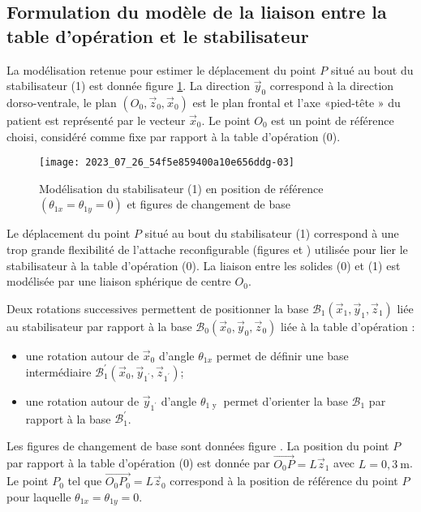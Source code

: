 \subsection{\label{sec:I.B}Formulation du modèle de la liaison entre la table d'opération et le stabilisateur}
La modélisation retenue pour estimer le déplacement du point $P$ situé au bout du stabilisateur (1) est donnée figure \ref{fig_ccspsi2022:05}. La direction $\vec{y}_{0}$ correspond à la direction dorso-ventrale, le plan $\left(O_{0}, \vec{z}_{0}, \vec{x}_{0}\right)$ est le plan frontal et l'axe «pied-tête » du patient est représenté par le vecteur $\vec{x}_{0}$. Le point $O_{0}$ est un point de référence choisi, considéré comme fixe par rapport à la table d'opération (0).

\begin{figure}[!h]
\centering
\texttt{[image: 2023\_07\_26\_54f5e859400a10e656ddg-03]}
\caption{Modélisation du stabilisateur (1) en position de référence $\left(\theta_{1 x}=\theta_{1 y}=0\right)$ et figures de changement de base\label{fig_ccspsi2022:05}}
\end{figure}


Le déplacement du point $P$ situé au bout du stabilisateur (1) correspond à une trop grande flexibilité de l'attache reconfigurable (figures \label{fig_ccspsi2022:01} et \label{fig_ccspsi2022:02}) utilisée pour lier le stabilisateur à la table d'opération (0). La liaison entre les solides (0) et (1) est modélisée par une liaison sphérique de centre $O_{0}$.

Deux rotations successives permettent de positionner la base $\mathcal{B}_{1}\left(\vec{x}_{1}, \vec{y}_{1}, \vec{z}_{1}\right)$ liée au stabilisateur par rapport à la base $\mathcal{B}_{0}\left(\vec{x}_{0}, \vec{y}_{0}, \vec{z}_{0}\right)$ liée à la table d'opération :
\begin{itemize}
\item une rotation autour de $\vec{x}_{0}$ d'angle $\theta_{1 x}$ permet de définir une base intermédiaire $\mathcal{B}_{1}^{\prime}\left(\vec{x}_{0}, \vec{y}_{1^{\prime}}, \vec{z}_{1^{\prime}}\right)$;
\item une rotation autour de $\vec{y}_{1^{\prime}}$ d'angle $\theta_{1 \text { y }}$ permet d'orienter la base $\mathcal{B}_{1}$ par rapport à la base $\mathcal{B}_{1}^{\prime}$.
\end{itemize}

Les figures de changement de base sont données figure \label{fig_ccspsi2022:05}. La position du point $P$ par rapport à la table d'opération (0) est donnée par $\overrightarrow{O_{0} P}=L \vec{z}_{1}$ avec $L=0,3 \mathrm{~m}$. Le point $P_{0}$ tel que $\overrightarrow{O_{0} P_{0}}=L \vec{z}_{0}$ correspond à la position de référence du point $P$ pour laquelle $\theta_{1 x}=\theta_{1 y}=0$.


